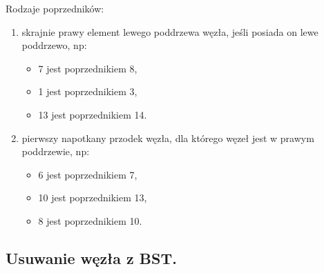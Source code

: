 \documentclass[12pt]{article}
\begin{document}
    Rodzaje poprzedników:
    \begin{enumerate}
        \item skrajnie prawy element lewego poddrzewa węzła, jeśli posiada on lewe poddrzewo, np:
        \begin{itemize}
            \item 7 jest poprzednikiem 8,
            \item 1 jest poprzednikiem 3,
            \item 13 jest poprzednikiem 14.
        \end{itemize}
        \item pierwszy napotkany przodek węzła, dla którego węzeł jest w prawym poddrzewie, np:
        \begin{itemize}
            \item 6 jest poprzednikiem 7,
            \item 10 jest poprzednikiem 13,
            \item 8 jest poprzednikiem 10.
        \end{itemize}
    \end{enumerate}

    \subsection{Usuwanie węzła z BST.}
\end{document}

